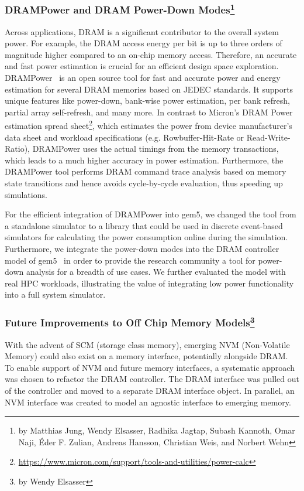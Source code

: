 \subsubsection[DRAMPower and DRAM Power-Down Modes]{DRAMPower and DRAM Power-Down Modes\footnote{by Matthias Jung, Wendy Elsasser, Radhika Jagtap, Subash Kannoth, Omar Naji, Éder F.
Zulian, Andreas Hansson, Christian Weis, and Norbert Wehn }}
%
Across applications, DRAM is a significant contributor to the overall system power.
For example, the DRAM access energy per bit is up to three orders of magnitude higher compared to an on-chip memory access.
Therefore, an accurate and fast power estimation is crucial for an efficient design space exploration.
DRAMPower~\cite{kargoo_14} is an open source tool for fast and accurate power and energy estimation for several DRAM memories based on JEDEC standards.
It supports unique features like power-down, bank-wise power estimation, per bank refresh, partial array self-refresh, and many more.
In contrast to Micron’s DRAM Power estimation spread sheet\footnote{\url{https://www.micron.com/support/tools-and-utilities/power-calc}}, which estimates the power from device manufacturer’s data sheet and workload specifications (e.g. Rowbuffer-Hit-Rate or Read-Write-Ratio), DRAMPower uses the actual timings from the memory transactions, which leads to a much higher accuracy in power estimation.
Furthermore, the DRAMPower tool performs DRAM command trace analysis based on memory state transitions and hence avoids cycle-by-cycle evaluation, thus speeding up simulations.

For the efficient integration of DRAMPower into gem5, we changed the tool from a standalone simulator to a library that could be used in discrete event-based simulators for calculating the power consumption online during the simulation.
Furthermore, we integrate the power-down modes into the DRAM controller model of gem5~\cite{jagjun_17} in order to provide the research community a tool for power-down analysis for a breadth of use cases. We further evaluated the model with real HPC workloads, illustrating the value of integrating low power functionality into a full system simulator.
%
\subsubsection[Future Improvements to Off Chip Memory Models]{Future Improvements to Off Chip Memory Models\footnote{by Wendy Elsasser}}
\label{sec:nvm}

With the advent of SCM (storage class memory), emerging NVM (Non-Volatile Memory) could also exist on a memory interface, potentially alongside DRAM.
To enable support of NVM and future memory interfaces, a systematic approach was chosen to refactor the DRAM controller.
The DRAM interface was pulled out of the controller and moved to a separate DRAM interface object.
In parallel, an NVM interface was created to model an agnostic interface to emerging memory.

